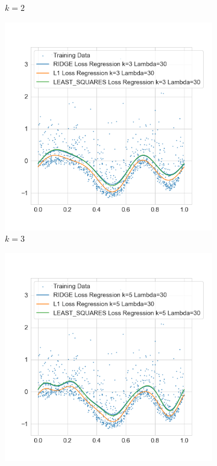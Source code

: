 \documentclass{./tufte-handout}
\begin{document}
\begin{enumerate}[(a)]
\begin{enumerate}
\begin{figure}[!ht]
\begin{subfigure}[b]{.5\textwidth}
          \caption{$k=2$}
        \end{subfigure}
        \begin{subfigure}[b]{.5\textwidth}
          \centering
          \includegraphics[width=1.2\linewidth]{../figures/l1_vs_ridge_regression_vs_least_squares_k_3_lambda_30.png}
          \caption{$k=3$}
        \end{subfigure}%
        \hfill
        \begin{subfigure}[b]{.5\textwidth}
          \centering
          \includegraphics[width=1.2\linewidth]{../figures/l1_vs_ridge_regression_vs_least_squares_k_5_lambda_30.png}

\end{subfigure}
\end{figure}
\end{enumerate}
\end{enumerate}
\end{document}
